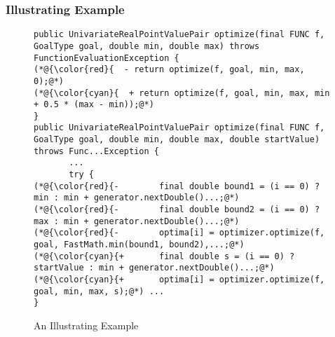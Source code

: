 \subsubsection{{\bf Illustrating Example}}
\label{sec:example}



\begin{figure}[t]
	\centering
	\begin{lstlisting}[]
public UnivariateRealPointValuePair optimize(final FUNC f, GoalType goal, double min, double max) throws FunctionEvaluationException {
(*@{\color{red}{  - return optimize(f, goal, min, max, 0);@*)
(*@{\color{cyan}{  + return optimize(f, goal, min, max, min + 0.5 * (max - min));@*)
}
public UnivariateRealPointValuePair optimize(final FUNC f, GoalType goal, double min, double max, double startValue) throws Func...Exception {
       ...
       try {
(*@{\color{red}{-        final double bound1 = (i == 0) ? min : min + generator.nextDouble()...;@*)
(*@{\color{red}{-        final double bound2 = (i == 0) ? max : min + generator.nextDouble()...;@*)
(*@{\color{red}{-        optima[i] = optimizer.optimize(f, goal, FastMath.min(bound1, bound2),...;@*)
(*@{\color{cyan}{+       final double s = (i == 0) ? startValue : min + generator.nextDouble()...;@*)
(*@{\color{cyan}{+       optima[i] = optimizer.optimize(f, goal, min, max, s);@*) ...
}
\end{lstlisting}
        \vspace{-18pt}
	\caption{An Illustrating Example}
	\label{example}
\end{figure}


